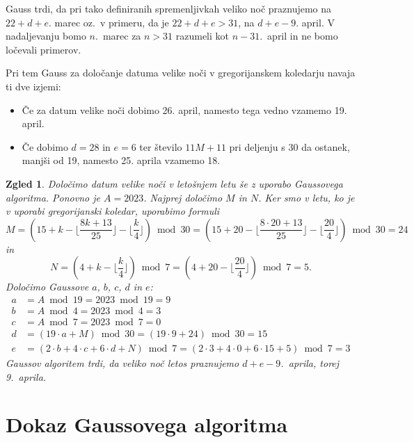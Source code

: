 \documentclass[a4paper,12pt]{article}
\newtheorem{zgled}{Zgled}
\begin{document}
Gauss trdi, da pri tako definiranih spremenljivkah veliko noč praznujemo na 
$22 + d + e$. marec oz.\ v primeru, da je $22 + d + e > 31$, na $d + e - 9$. april.
V nadaljevanju bomo $n$.\ marec za $n > 31$ razumeli kot $n - 31$.\ april in ne 
bomo ločevali primerov.

Pri tem Gauss za določanje datuma velike noči v gregorijanskem koledarju navaja 
ti dve izjemi:
\begin{itemize}
    \item Če za datum velike noči dobimo 26. april, namesto tega vedno vzamemo 
        19. april.
    \item Če dobimo $d = 28$ in $e = 6$ ter število $11M+11$ pri deljenju s 
        30 da ostanek, manjši od 19, namesto 25. aprila vzamemo 18.
\end{itemize}

\begin{zgled}
    Določimo datum velike noči v letošnjem letu še z uporabo Gaussovega algoritma. 
    Ponovno je $A = 2023$. Najprej določimo $M$ in $N$. Ker smo v letu, ko je v 
    uporabi gregorijanski koledar, uporabimo formuli 
    $$M = (15 + k - \lfloor \textstyle \frac{8k + 13}{25} \rfloor - \lfloor \frac{k}{4} \rfloor) \bmod 30 = (15 + 20 - \lfloor \frac{8 \cdot 20 + 13}{25} \rfloor - \lfloor \frac{20}{4} \rfloor) \bmod 30 = 24$$ 
    in
    $$N = (4 + k - \lfloor \textstyle \frac{k}{4} \rfloor) \bmod 7 = (4 + 20 - \lfloor \frac{20}{4} \rfloor) \bmod 7 = 5.$$
    Določimo Gaussove $a$, $b$, $c$, $d$ in $e$:
    \begin{align*}
        a &= A \bmod 19 = 2023 \bmod 19 = 9 \\
        b &= A \bmod 4 = 2023 \bmod 4 = 3 \\
        c &= A \bmod 7 = 2023 \bmod 7 = 0 \\
        d &= (19 \cdot a + M) \bmod 30 = (19 \cdot 9 + 24) \bmod 30 = 15 \\
        e &= (2 \cdot b + 4 \cdot c + 6 \cdot d + N) \bmod 7 = (2 \cdot 3 + 4 \cdot 0 + 6 \cdot 15 + 5) \bmod 7 = 3
    \end{align*}
    Gaussov algoritem trdi, da veliko noč letos praznujemo $d + e - 9$.\ aprila, torej
    9.\ aprila.
\end{zgled}




\section{Dokaz Gaussovega algoritma}
\end{document}
